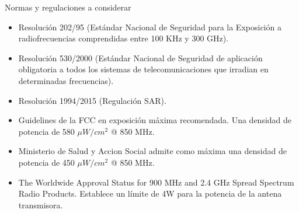 Normas y regulaciones a considerar

\begin{itemize}
\item Resolución 202/95  (Estándar Nacional de Seguridad para la Exposición a radiofrecuencias comprendidas entre 100 KHz y 300 GHz).
\item Resolución 530/2000 (Estándar Nacional de Seguridad de aplicación obligatoria a todos los sistemas de telecomunicaciones que irradian en determinadas frecuencias).
\item Resolución 1994/2015 (Regulación SAR).
\item Guidelines de la FCC en exposición máxima recomendada. Una densidad de potencia de 580 $\mu W/{cm}^2$ @ 850 MHz.
\item Ministerio de Salud y Accion Social admite como máxima una densidad de potencia de 450 $\mu W/{cm}^2$ @ 850 MHz.
\item The Worldwide Approval Status for 900 MHz and 2.4 GHz Spread Spectrum Radio Products. Establece un límite de 4W para la potencia de la antena transmisora.

\end{itemize}









